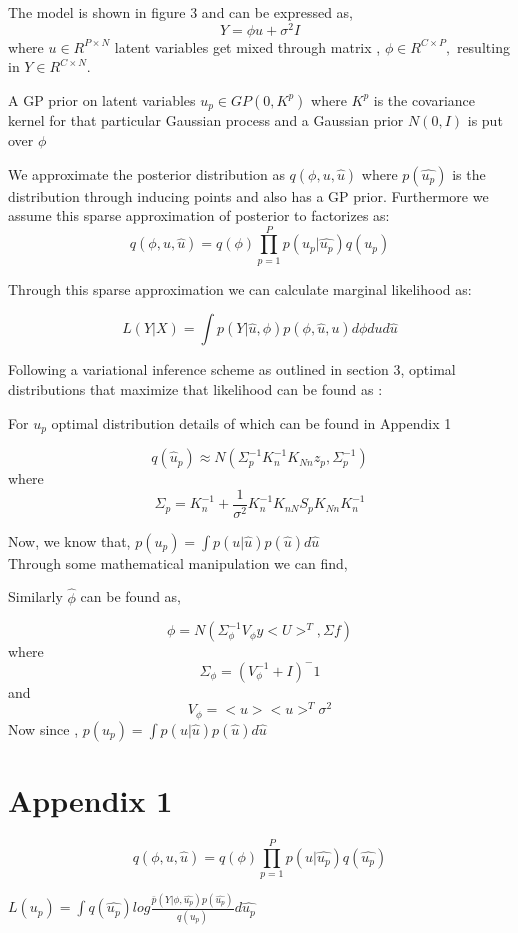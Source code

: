 \documentclass{article}
\begin{document}
The model is shown in figure 3 and can be expressed as, $${Y=\phi u + \sigma^2I}$$ where ${u \in R^{P \times N}}$ latent variables get mixed through matrix , ${\phi \in R^{C \times P},}$ resulting in  ${Y \in R^{C \times N}}$.

A GP prior on latent variables $ u_p \in GP(0,K^p)$ where $K^p$ is the covariance kernel for that particular Gaussian process and a Gaussian prior $N(0,I)$ is put over $\phi$ 

We approximate the posterior distribution as $ q(\phi,u,\hat{u})$ where  $p(\hat{u_p})$ is the distribution through inducing points and also has a GP prior. Furthermore we assume this sparse approximation of posterior to factorizes as: $${q(\phi,u,\hat{u}) = q(\phi)\prod_{p=1}^{P}p(u_p|\hat{u_p})q(u_p)}$$

Through this sparse approximation we can calculate marginal likelihood as:

$${L(Y|X) = \int p(Y|\hat{u},\phi) p(\phi,\hat{u},u) d\phi du d\hat{u}}$$

Following a variational inference scheme as outlined in section 3, optimal distributions that maximize that likelihood can be found as :

For $\hat{u_p}$ optimal distribution details of which can be found in Appendix 1

$${q(\hat{u}_p) \approx N(\Sigma_{p}^{-1}K_{n}^{-1}K_{Nn}z_p,\Sigma_{p}^{-1})}$$
where $${\Sigma_{p} = K_{n}^{-1} + \frac{1}{\sigma^2}K_{n}^{-1}K_{nN}S_pK_{Nn}K_{n}^{-1}}$$

Now, we know that, ${p(u_p) = \int p(u|\hat{u})p(\hat{u})d\hat{u}}$ \\
Through some mathematical manipulation we can find, 



Similarly $\hat{\phi}$ can be found as, 

$${\phi = N(\Sigma_{\phi}^{-1}V_{\phi}y<U>^T, \Sigma{f})}$$
where $${\Sigma_{\phi} = (V_{\phi}^{-1} + I )^-1}$$
and $${V_{\phi} = <u><u>^T\sigma^2}$$
Now since , ${p(u_p) = \int p(u|\hat{u})p(\hat{u})d\hat{u}}$ \\



\section{Appendix 1}


$${ q(\phi,u, \hat{u}) = q(\phi)\prod_{p=1}^{P}p(u|\hat{u_p})q(\hat{u_p}) }$$


${ L(u_p) = \int q(\hat{u_p}) log \frac{\bar{p}(Y|\phi,\hat{u_p})p(\hat{u_p})}{q(u_p)} d\hat{u_p}}$
\end{document}

